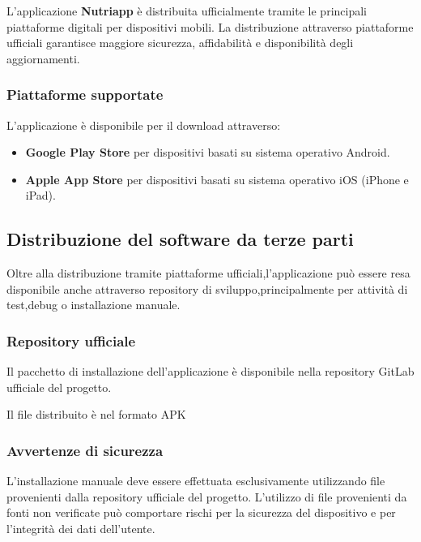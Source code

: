 \documentclass[a4paper,12pt]{article}
\begin{document}
    L'applicazione \textbf{Nutriapp} è distribuita ufficialmente tramite le principali piattaforme digitali per dispositivi mobili. La distribuzione attraverso piattaforme ufficiali garantisce maggiore sicurezza, affidabilità e disponibilità degli aggiornamenti.

    \subsubsection*{Piattaforme supportate}

    L'applicazione è disponibile per il download attraverso:

    \begin{itemize}

        \item \textbf{Google Play Store}
        per dispositivi basati su sistema operativo Android.

        \item \textbf{Apple App Store}
        per dispositivi basati su sistema operativo iOS
        (iPhone e iPad).

    \end{itemize}


    \subsection{Distribuzione del software da terze parti}

    Oltre alla distribuzione tramite piattaforme ufficiali,l'applicazione può essere resa disponibile anche attraverso repository di sviluppo,principalmente per attività di test,debug o installazione manuale.

    \subsubsection*{Repository ufficiale}

    Il pacchetto di installazione dell'applicazione è disponibile nella repository GitLab ufficiale del progetto.

    Il file distribuito è nel formato APK

    \subsubsection*{Avvertenze di sicurezza}

    L'installazione manuale deve essere effettuata esclusivamente utilizzando file provenienti dalla repository ufficiale del progetto. L'utilizzo di file provenienti da fonti non verificate può comportare rischi per la sicurezza del dispositivo e per l'integrità dei dati dell'utente.
\end{document}
